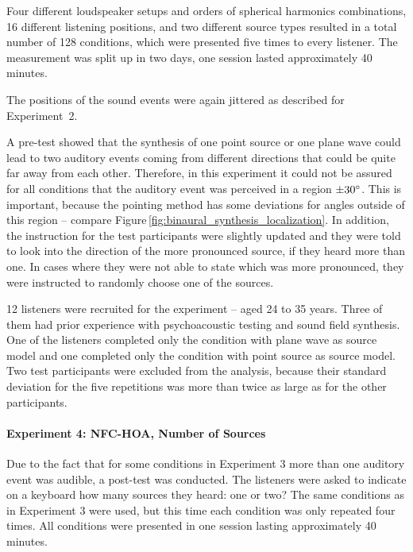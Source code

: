 Four different loudspeaker setups and orders of spherical harmonics
combinations, 16 different listening positions, and two different source types
resulted in a total number of 128 conditions, which were presented five times to
every listener. The measurement was split up in two days, one session lasted
approximately 40 minutes.

The positions of the sound events were again jittered as described for
Experiment~2.

A pre-test showed that the synthesis of one point source or one plane wave
could lead to two auditory events coming from different directions that could be
quite far away from each other. Therefore, in this experiment it could not be
assured for all conditions that the auditory event was perceived in a region $\pm
30^\circ$. This is important, because the pointing method has some
deviations for angles outside of this region -- compare
Figure\,\ref{fig:binaural_synthesis_localization}.
In addition, the instruction for the test participants were slightly updated and
they were told to look into the direction of the more pronounced source,
if they heard more than one. In cases where they were not able to state which
was
more pronounced, they were instructed to randomly choose one of the sources.

12 listeners were recruited for the experiment -- aged 24 to 35 years.
Three of them had prior experience with psychoacoustic testing and sound field
synthesis.
One of the listeners completed only the condition with plane wave as source
model and one completed only the condition with point source as source model.
Two test participants were excluded from the analysis, because their standard deviation
for the five repetitions was more than twice as large as for the other
participants.


\paragraph{Experiment 4: \ac{NFC-HOA}, Number of Sources}
\label{sec:experiment4_nfchoa_circular_loudspeaker_array_number_of_sources}
%
Due to the fact that for some conditions in Experiment 3 more than one auditory
event was audible, a post-test was conducted. The listeners were asked to
indicate on a keyboard how many sources they heard: one or two?
The same conditions as in Experiment 3 were used, but this time each condition
was only repeated four times.
All conditions were presented in one session lasting approximately 40 minutes.

